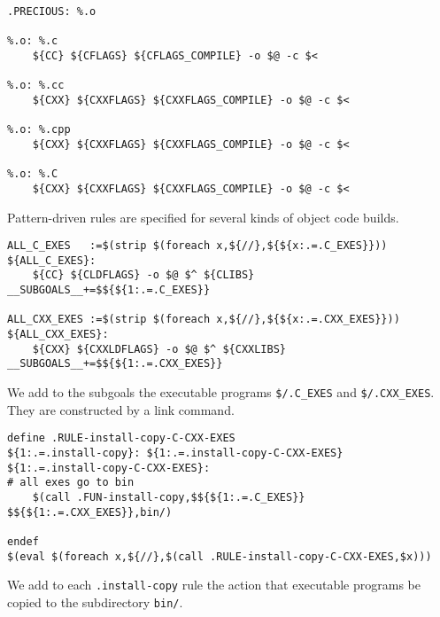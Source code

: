 \documentclass{article}
\begin{document}
\begin{verbatim}
.PRECIOUS: %.o

%.o: %.c
	${CC} ${CFLAGS} ${CFLAGS_COMPILE} -o $@ -c $<

%.o: %.cc
	${CXX} ${CXXFLAGS} ${CXXFLAGS_COMPILE} -o $@ -c $<

%.o: %.cpp
	${CXX} ${CXXFLAGS} ${CXXFLAGS_COMPILE} -o $@ -c $<

%.o: %.C
	${CXX} ${CXXFLAGS} ${CXXFLAGS_COMPILE} -o $@ -c $<
\end{verbatim}
Pattern-driven rules are specified for several kinds of
object code builds.

\begin{verbatim}
ALL_C_EXES   :=$(strip $(foreach x,${//},${${x:.=.C_EXES}}))
${ALL_C_EXES}:
	${CC} ${CLDFLAGS} -o $@ $^ ${CLIBS}
__SUBGOALS__+=$${${1:.=.C_EXES}}

ALL_CXX_EXES :=$(strip $(foreach x,${//},${${x:.=.CXX_EXES}}))
${ALL_CXX_EXES}:
	${CXX} ${CXXLDFLAGS} -o $@ $^ ${CXXLIBS}
__SUBGOALS__+=$${${1:.=.CXX_EXES}}
\end{verbatim}
We add to the subgoals the executable programs \verb+$/.C_EXES+ and
\verb+$/.CXX_EXES+.  They are constructed by a link command.

\begin{verbatim}
define .RULE-install-copy-C-CXX-EXES
${1:.=.install-copy}: ${1:.=.install-copy-C-CXX-EXES}
${1:.=.install-copy-C-CXX-EXES}:
# all exes go to bin
	$(call .FUN-install-copy,$${${1:.=.C_EXES}} $${${1:.=.CXX_EXES}},bin/)

endef
$(eval $(foreach x,${//},$(call .RULE-install-copy-C-CXX-EXES,$x)))
\end{verbatim}
We add to each \verb+.install-copy+ rule the action that executable
programs be copied to the subdirectory \verb+bin/+.
\end{document}

